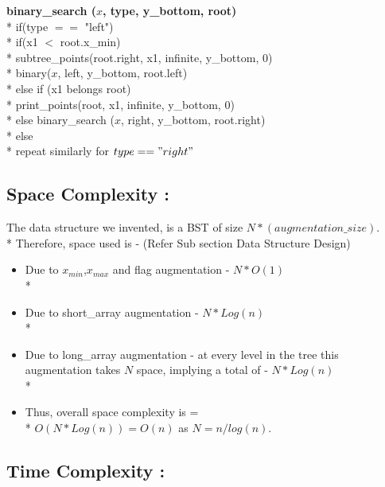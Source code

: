 \documentclass{article}
\begin{document}
\newpage
{\bf binary\_search ($x$, type, y\_bottom, root)}\\*
\hspace*{1cm} if(type $==$ "left") \\*
\hspace*{2cm}    if(x1 $<$ root.x\_min) \\*
\hspace*{3cm}    subtree\_points(root.right, x1, infinite, y\_bottom, 0) \\*
\hspace*{3cm}    binary($x$, left, y\_bottom, root.left) \\*
\hspace*{2cm}    else if (x1 belongs root) \\*
\hspace*{3cm}      print\_points(root, x1, infinite, y\_bottom, 0) \\*
\hspace*{2cm}    else binary\_search ($x$, right, y\_bottom, root.right)\\*
\hspace*{1cm}else \\*
\hspace*{2cm} repeat similarly for $type=="right"$

\subsection{Space Complexity : }
The data structure we invented, is a BST of size $N*(augmentation\_size)$.\\*
Therefore, space used is - (Refer Sub section Data Structure Design)
\begin{itemize}
\item Due to $x_{min}$,$x_{max}$ and flag augmentation - $N * O(1)$ \\*
\item Due to short\_array augmentation - $N * Log(n)$ \\*
\item Due to long\_array augmentation - at every level in the tree this augmentation takes $N$ space, implying a total of - $N * Log(n)$ \\*  
\item Thus, overall space complexity is = \\*
$O(N*Log(n)) = O(n)$ as $N = n/log(n)$.
\end{itemize}
\subsection{Time Complexity : }
\end{document}
